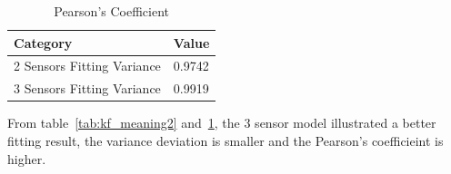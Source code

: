 \documentclass[11pt, a4paper]{article}
\begin{document}
\begin{table}[htbp] 
	\begin{center}
		\caption{Pearson's Coefficient}
		\begin{tabular}{l|l}  \hline
			Category & Value \\ \hline
			2 Sensors Fitting Variance & 0.9742 \\ \hline
			3 Sensors Fitting Variance & 0.9919 \\ \hline
		\end{tabular}
		
		\label{tab:kf_meaning3}
	\end{center}
\end{table}	

From table~\ref{tab:kf_meaning2} and~\ref*{tab:kf_meaning3}, the 3 sensor model illustrated a better fitting result, the variance deviation is smaller and the Pearson's coefficieint is higher.


  
 





\end{document}
